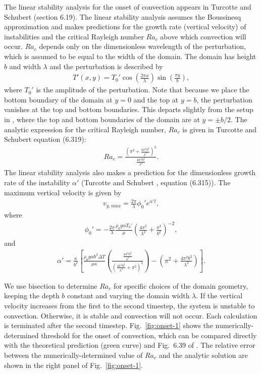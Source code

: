 \documentclass{article}
\begin{document}
The linear stability analysis for the onset of convection appears in Turcotte and Schubert \cite{TS14} (section 6.19). The linear stability analysis assumes the Boussinesq approximation and makes predictions for the growth rate (vertical velocity) of instabilities and the critical Rayleigh number $Ra_c$ above which convection will occur. $Ra_c$ depends only on the dimensionless wavelength of the perturbation, which is assumed to be equal to the width of the domain. The domain has height $b$ and width $\lambda$ and the perturbation is described by
\begin{align*}
T'(x,y) = T_0'\cos\left(\frac{2\pi x}{\lambda}\right)\sin\left(\frac{\pi y}{b} \right),
\end{align*}
where $T_0'$ is the amplitude of the perturbation. Note that because we place the bottom boundary of the domain at $y=0$ and the top at $y=b$, the perturbation vanishes at the top and bottom boundaries. This departs slightly from the setup in \cite{TS14}, where the top and bottom boundaries of the domain are at $y=\pm b/2$. The analytic expression for the critical Rayleigh number, $Ra_c$ is given in Turcotte and Schubert \cite{TS14} equation (6.319):
\begin{align*}
Ra_c=\frac{\left(\pi^2+\frac{4\pi^2 b^2}{\lambda^2}\right)^3}{\frac{4\pi^2 b^2}{\lambda^2}}.
\end{align*}
The linear stability analysis also makes a prediction for the dimensionless growth rate of the instability $\alpha'$ (Turcotte and Schubert \cite{TS14}, equation (6.315)). The maximum vertical velocity is given by
\begin{align*}
v_{y,max} = \frac{2\pi}{\lambda}\phi_0' e^{\alpha' t},
\end{align*}
where
\begin{align*}
\phi_0' = -\frac{2\pi}{\lambda}\frac{\rho_0 g \alpha T_0'}{\mu}\left(\frac{4\pi^2}{\lambda^2}+\frac{\pi^2}{b^2} \right)^{-2},
\end{align*}
and
\begin{align*}
\alpha'=\frac{\kappa}{b^2}\left[\frac{\rho_0 g \alpha b^3 \Delta T}{\mu \kappa}\left(\frac{\frac{4\pi^2 b^2}{\lambda^2}}{\left(\frac{4\pi^2 b^2}{\lambda^2}+\pi^2\right)^2}\right) -\left(\pi^2+\frac{4\pi^2b^2}{\lambda^2}\right)\right].
\end{align*}

We use bisection to determine $Ra_c$ for specific choices of the domain geometry, keeping the depth $b$ constant and varying the domain width $\lambda$. If the vertical velocity increases from the first to the second timestep, the system is unstable to convection. Otherwise, it is stable and convection will not occur. Each calculation is terminated after the second timestep. Fig.~\ref{fig:onset-1} shows the numerically-determined threshold for the onset of convection, which can be compared directly with the theoretical prediction (green curve) and Fig.~6.39 of \cite{TS14}. The relative error between the numerically-determined value of $Ra_c$ and the analytic solution are shown in the right panel of Fig.~\ref{fig:onset-1}.
\end{document}
